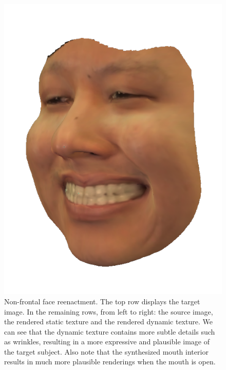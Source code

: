 \documentclass[10pt,twocolumn,letterpaper]{article}
\begin{document}
\begin{figure}[th]
\begin{center}
  \includegraphics[width=0.32\columnwidth]{figures/kylehao_transfer/dynamic_000066.png}
\end{center}
   \caption{Non-frontal face reenactment. The top row displays the target image. In the remaining rows, from left to right: the source image, the rendered static texture and the rendered dynamic texture. We can see that the dynamic texture contains more subtle details such as wrinkles, resulting in a more expressive and plausible image of the target subject. Also note that the synthesized mouth interior results in much more plausible renderings when the mouth is open.}
   \vspace{-0.05in}
\label{fig:replaceres}
\end{figure}
\end{document}
